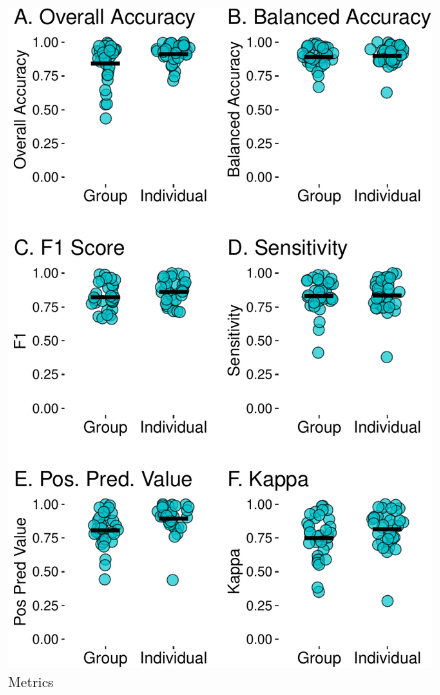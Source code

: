 \documentclass[
  man]{apa6}
\begin{document}
\begin{figure}

{\centering \includegraphics{manuscript_files/figure-latex/metrics-1} 

}

\caption{Metrics}\label{fig:metrics}
\end{figure}
\end{document}
